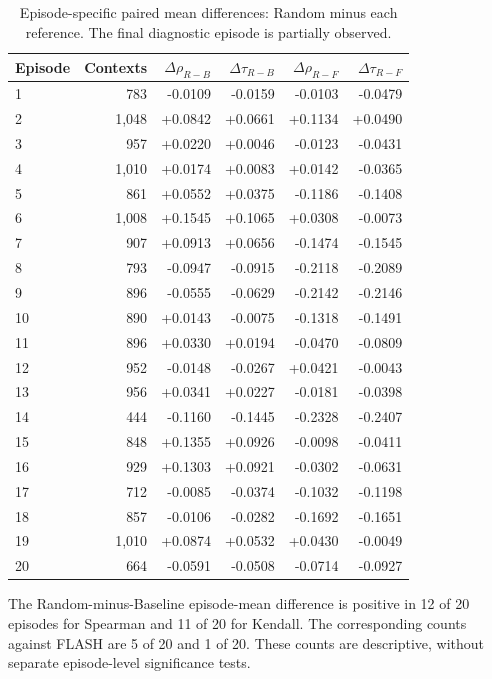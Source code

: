 \begin{table}[!htbp]
\centering
\small
\caption{Episode-specific paired mean differences: Random minus each reference. The final diagnostic episode is partially observed.}
\label{tab:random11010_episode_differences}
\begin{tabular}{lrrrrr}
\toprule
Episode & Contexts & $\Delta\rho_{R-B}$ & $\Delta\tau_{R-B}$ & $\Delta\rho_{R-F}$ & $\Delta\tau_{R-F}$ \\
\midrule
1 & 783 & -0.0109 & -0.0159 & -0.0103 & -0.0479 \\
2 & 1,048 & +0.0842 & +0.0661 & +0.1134 & +0.0490 \\
3 & 957 & +0.0220 & +0.0046 & -0.0123 & -0.0431 \\
4 & 1,010 & +0.0174 & +0.0083 & +0.0142 & -0.0365 \\
5 & 861 & +0.0552 & +0.0375 & -0.1186 & -0.1408 \\
6 & 1,008 & +0.1545 & +0.1065 & +0.0308 & -0.0073 \\
7 & 907 & +0.0913 & +0.0656 & -0.1474 & -0.1545 \\
8 & 793 & -0.0947 & -0.0915 & -0.2118 & -0.2089 \\
9 & 896 & -0.0555 & -0.0629 & -0.2142 & -0.2146 \\
10 & 890 & +0.0143 & -0.0075 & -0.1318 & -0.1491 \\
11 & 896 & +0.0330 & +0.0194 & -0.0470 & -0.0809 \\
12 & 952 & -0.0148 & -0.0267 & +0.0421 & -0.0043 \\
13 & 956 & +0.0341 & +0.0227 & -0.0181 & -0.0398 \\
14 & 444 & -0.1160 & -0.1445 & -0.2328 & -0.2407 \\
15 & 848 & +0.1355 & +0.0926 & -0.0098 & -0.0411 \\
16 & 929 & +0.1303 & +0.0921 & -0.0302 & -0.0631 \\
17 & 712 & -0.0085 & -0.0374 & -0.1032 & -0.1198 \\
18 & 857 & -0.0106 & -0.0282 & -0.1692 & -0.1651 \\
19 & 1,010 & +0.0874 & +0.0532 & +0.0430 & -0.0049 \\
20 & 664 & -0.0591 & -0.0508 & -0.0714 & -0.0927 \\
\bottomrule
\end{tabular}
\end{table}

The Random-minus-Baseline episode-mean difference is positive in 12 of 20 episodes for Spearman and 11 of 20 for Kendall. The corresponding counts against FLASH are 5 of 20 and 1 of 20. These counts are descriptive, without separate episode-level significance tests.


